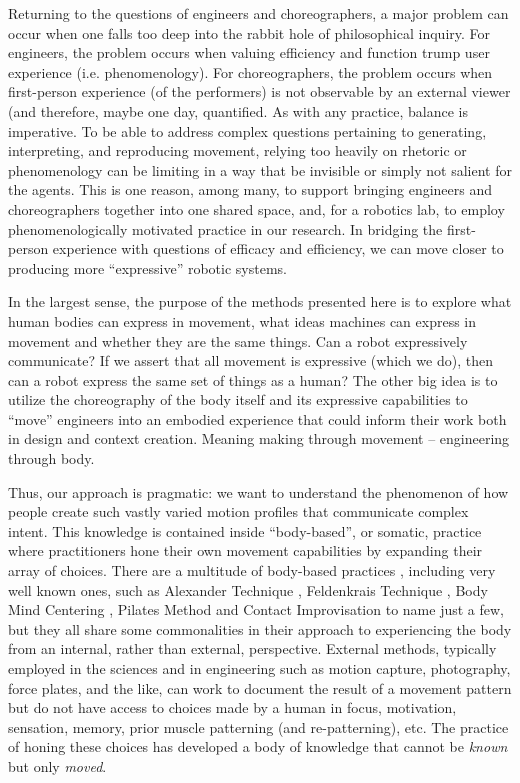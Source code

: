 \documentclass[arts,article,submit,moreauthors,pdftex,10pt,a4paper]{mdpi}
\begin{document}
Returning to the questions of engineers and choreographers, a major problem can occur when one falls too deep into the rabbit hole of philosophical inquiry. For engineers, the problem occurs when valuing efficiency and function trump user experience (i.e. phenomenology). For choreographers, the problem occurs when first-person experience (of the performers) is not observable by an external viewer (and therefore, maybe one day, quantified. As with any practice, balance is imperative. To be able to address complex questions pertaining to generating, interpreting, and reproducing movement, relying too heavily on rhetoric or phenomenology can be limiting in a way that be invisible or simply not salient for the agents. This is one reason, among many, to support bringing engineers and choreographers together into one shared space, and, for a robotics lab, to employ phenomenologically motivated practice in our research. In bridging the first-person experience with questions of efficacy and efficiency, we can move closer to producing more {``expressive''} robotic systems.

In the largest sense, the purpose of the methods presented here is to explore what human bodies can express in movement, what ideas machines can express in movement and whether they are the same things. Can a robot expressively communicate?  If we assert that all movement is expressive (which we do), then can a robot express the same set of things as a human?  The other big idea is to utilize the choreography of the body itself and its expressive capabilities to ``move''  engineers into an embodied experience that could inform their work both in design and context creation.  Meaning making through movement -- engineering through body.

Thus, our approach is pragmatic: we want to understand the phenomenon of how people create such vastly varied motion profiles that communicate complex intent.  This knowledge is contained inside ``body-based'', or somatic, practice where practitioners hone their own movement capabilities by expanding their array of choices.  There are a multitude of body-based practices \cite{foster2004somatic}, including very well known ones, such as Alexander Technique \cite{alexander1990alexander}, Feldenkrais Technique \cite{feldenkrais1972awareness}, Body Mind Centering \cite{cohen2012sensing}, Pilates Method \cite{latey2001pilates} and Contact Improvisation \cite{pallant2006contact} to name just a few, but they all share some commonalities in their approach to experiencing the body from an internal, rather than external, perspective.  External methods, typically employed in the sciences and in engineering such as motion capture, photography, force plates, and the like, can work to document the result of a movement pattern but do not have access to choices made by a human in focus, motivation, sensation, memory, prior muscle patterning (and re-patterning), etc.  The practice of honing these choices has developed a body of knowledge that cannot be \textit{known} but only \textit{moved}.
\end{document}
